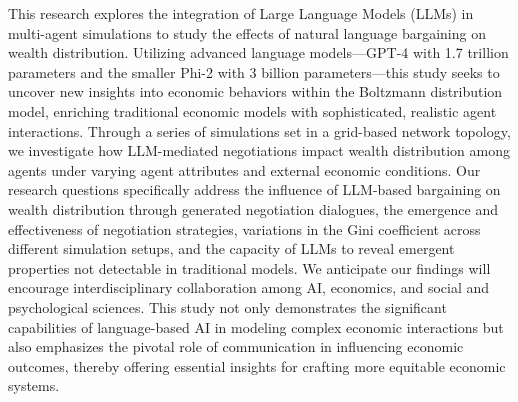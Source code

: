 
\begin{Abstrakt}
    This research explores the integration of Large Language Models (LLMs) in multi-agent simulations to study the effects of natural language bargaining on wealth distribution. Utilizing advanced language models—GPT-4 with 1.7 trillion parameters and the smaller Phi-2 with 3 billion parameters—this study seeks to uncover new insights into economic behaviors within the Boltzmann distribution model, enriching traditional economic models with sophisticated, realistic agent interactions. Through a series of simulations set in a grid-based network topology, we investigate how LLM-mediated negotiations impact wealth distribution among agents under varying agent attributes and external economic conditions. Our research questions specifically address the influence of LLM-based bargaining on wealth distribution through generated negotiation dialogues, the emergence and effectiveness of negotiation strategies, variations in the Gini coefficient across different simulation setups, and the capacity of LLMs to reveal emergent properties not detectable in traditional models. We anticipate our findings will encourage interdisciplinary collaboration among AI, economics, and social and psychological sciences. This study not only demonstrates the significant capabilities of language-based AI in modeling complex economic interactions but also emphasizes the pivotal role of communication in influencing economic outcomes, thereby offering essential insights for crafting more equitable economic systems.
\end{Abstrakt}



\clearpage